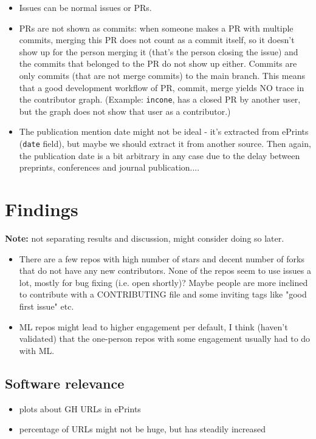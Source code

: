 \documentclass[10pt,a4paper]{scrartcl}
\begin{document}
\begin{itemize}
    \item Issues can be normal issues or PRs.
    \item PRs are not shown as commits: when someone makes a PR with multiple commits, merging this PR does not count as a commit itself, so it doesn't show up for the person merging it (that's the person closing the issue) and the commits that belonged to the PR do not show up either. Commits are only commits (that are not merge commits) to the main branch. This means that a good development workflow of PR, commit, merge yields NO trace in the contributor graph. (Example: \verb|incone|, has a closed PR by another user, but the graph does not show that user as a contributor.)
    \item The publication mention date might not be ideal - it's extracted from ePrints (\verb|date| field), but maybe we should extract it from another source. Then again, the publication date is a bit arbitrary in any case due to the delay between preprints, conferences and journal publication....
\end{itemize}

\section*{Findings}

\textbf{Note:} not separating results and discussion, might consider doing so later.

\begin{itemize}
    \item There are a few repos with high number of stars and decent number of forks that do not have any new contributors. None of the repos seem to use issues a lot, mostly for bug fixing (i.e. open shortly)? Maybe people are more inclined to contribute with a CONTRIBUTING file and some inviting tags like "good first issue" etc.
    \item ML repos might lead to higher engagement per default, I think (haven't validated) that the one-person repos with some engagement usually had to do with ML.
\end{itemize}

\subsection*{Software relevance}

\begin{itemize}
    \item plots about GH URLs in ePrints
    \item percentage of URLs might not be huge, but has steadily increased
\end{itemize}
\end{document}
